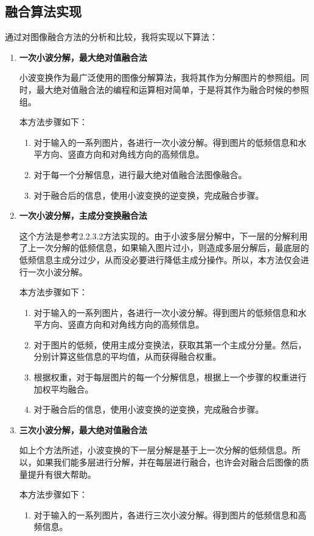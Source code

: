 \documentclass{xduugthesis}
\begin{document}
\subsection{融合算法实现}
通过对图像融合方法的分析和比较，我将实现以下算法：
\begin{enumerate}
\item \textbf{一次小波分解，最大绝对值融合法}\par
小波变换作为最广泛使用的图像分解算法，我将其作为分解图片的参照组。同时，最大绝对值融合法的编程和运算相对简单，于是将其作为融合时候的参照组。\par
本方法步骤如下：
\begin{enumerate}
	\item 对于输入的一系列图片，各进行一次小波分解。得到图片的低频信息和水平方向、竖直方向和对角线方向的高频信息。
	\item 对于每一个分解信息，进行最大绝对值融合法图像融合。
	\item 对于融合后的信息，使用小波变换的逆变换，完成融合步骤。
\end{enumerate}
\item \textbf{一次小波分解，主成分变换融合法}\par
这个方法是参考2.2.3.2方法实现的。由于小波多层分解中，下一层的分解利用了上一次分解的低频信息，如果输入图片过小，则造成多层分解后，最底层的低频信息主成分过少，从而没必要进行降低主成分操作。所以，本方法仅会进行一次小波分解。\par
本方法步骤如下：
\begin{enumerate}
	\item 对于输入的一系列图片，各进行一次小波分解。得到图片的低频信息和水平方向、竖直方向和对角线方向的高频信息。
	\item 对于图片的低频，使用主成分变换法，获取其第一个主成分分量。然后，分别计算这些信息的平均值，从而获得融合权重。
	\item 根据权重，对于每层图片的每一个分解信息，根据上一个步骤的权重进行加权平均融合。
	\item 对于融合后的信息，使用小波变换的逆变换，完成融合步骤。
\end{enumerate}
\item \textbf{三次小波分解，最大绝对值融合法}\par
如上个方法所述，小波变换的下一层分解是基于上一次分解的低频信息。所以，如果我们能多层进行分解，并在每层进行融合，也许会对融合后图像的质量提升有很大帮助。\par
本方法步骤如下：
\begin{enumerate}
	\item 对于输入的一系列图片，各进行三次小波分解。得到图片的低频信息和高频信息。

\end{enumerate}
\end{enumerate}
\end{document}
